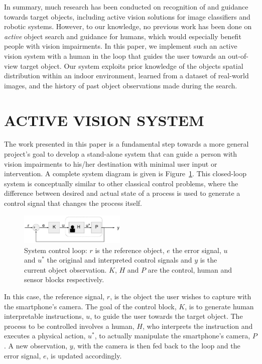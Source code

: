 \documentclass[a4paper, twoside]{article}
\begin{document}
In summary, much research has been conducted on recognition of and guidance towards target objects, including active vision solutions for image classifiers and robotic systems. However, to our knowledge, no previous work has been done on {\em active} object search and guidance for humans, which would especially benefit people with vision impairments. In this paper, we implement such an active vision system with a human in the loop
that guides the user towards an out-of-view target object. Our system exploits prior knowledge of the objects spatial distribution within an indoor environment, learned from a dataset of real-world images, and the history of past object observations made during the search.

\section{\uppercase{Active Vision System}}\label{sec:system-design}

\noindent The work presented in this paper is a fundamental step towards a more general project's goal to develop a stand-alone system that can guide a person with vision impairments to his/her destination with minimal user input or intervention. A complete system diagram is given is Figure~\ref{fig:control-loop}. This closed-loop system is conceptually similar to other classical control problems, where the difference between desired and actual state of a process is used to generate a control signal that changes the process itself.

\begin{figure}
  \centering
  \includegraphics[width=0.45\textwidth]{../figures/control_loop.png}
  \caption{System control loop: $r$ is the reference object, $e$ the error signal, $u$ and $u^*$ the original and interpreted control signals and $y$ is the current object observation. $K$, $H$ and $P$ are the control, human and sensor blocks respectively. }\label{fig:control-loop}
\end{figure}

In this case, the reference signal, $r$, is the object the user wishes to capture with the smartphone's camera. The goal of the control block, $K$, is to generate human interpretable instructions, $u$, to guide the user towards the target object. The process to be controlled involves a human, $H$, who interprets the instruction and executes a physical action, $u^*$, to actually manipulate the smartphone's camera, $P$. A new observation, $y$, with the camera is then fed back to the loop and the error signal, $e$, is updated accordingly.  
\end{document}
